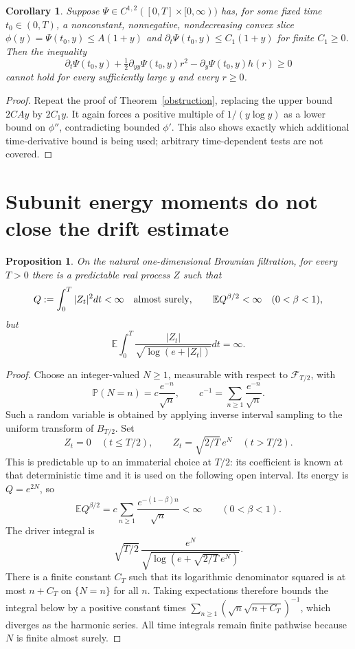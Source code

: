 \documentclass[11pt]{article}
\newtheorem{proposition}[theorem]{Proposition}
\newtheorem{corollary}[theorem]{Corollary}
\newcommand{\E}{\mathbb E}
\newcommand{\Prb}{\mathbb P}
\newcommand{\F}{\mathcal F}
\begin{document}
\begin{corollary}\label{timebound}
Suppose $\Psi\in C^{1,2}([0,T]\times[0,\infty))$ has, for some fixed
time $t_0\in(0,T)$, a nonconstant, nonnegative, nondecreasing convex
slice $\phi(y)=\Psi(t_0,y)\leq A(1+y)$ and
$\partial_t\Psi(t_0,y)\leq C_1(1+y)$ for finite $C_1\geq0$.
Then the inequality
\[
 \partial_t\Psi(t_0,y)+\tfrac12\partial_{yy}\Psi(t_0,y)r^2
                -\partial_y\Psi(t_0,y)h(r)\geq0
\]
cannot hold for every sufficiently large $y$ and every $r\geq0$.
\end{corollary}
\begin{proof}
Repeat the proof of Theorem~\ref{obstruction}, replacing the upper bound
$2CAy$ by $2C_1y$. It again forces a positive multiple of
$1/(y\log y)$ as a lower bound on $\phi''$, contradicting bounded
$\phi'$. This also shows exactly which additional time-derivative
bound is being used; arbitrary time-dependent tests are not covered.
\end{proof}

\section{Subunit energy moments do not close the drift estimate}
\begin{proposition}\label{energy}
On the natural one-dimensional Brownian filtration, for every $T>0$
there is a predictable real process $Z$ such that
\[
 Q:=\int_0^T|Z_t|^2dt<\infty\quad\hbox{almost surely},\qquad
 \E Q^{\beta/2}<\infty\quad(0<\beta<1),
\]
but
\[
 \E\int_0^T\frac{|Z_t|}{\sqrt{\log(e+|Z_t|)}}dt=\infty.
\]
\end{proposition}
\begin{proof}
Choose an integer-valued $N\geq1$, measurable with respect to
$\F_{T/2}$, with
\[
 \Prb(N=n)=c\frac{e^{-n}}{\sqrt n},\qquad
 c^{-1}=\sum_{n\geq1}\frac{e^{-n}}{\sqrt n}.
\]
Such a random variable is obtained by applying inverse interval sampling
to the uniform transform of $B_{T/2}$. Set
\[
 Z_t=0\quad(t\leq T/2),\qquad
 Z_t=\sqrt{2/T}\,e^N\quad(t>T/2).
\]
This is predictable up to an immaterial choice at $T/2$: its coefficient
is known at that deterministic time and it is used on the following open
interval. Its energy is $Q=e^{2N}$, so
\[
 \E Q^{\beta/2}
 =c\sum_{n\geq1}\frac{e^{-(1-\beta)n}}{\sqrt n}<\infty
 \qquad(0<\beta<1).
\]
The driver integral is
\[
 \sqrt{T/2}\,\frac{e^N}{\sqrt{\log(e+\sqrt{2/T}\,e^N)}}.
\]
There is a finite constant $C_T$ such that its logarithmic denominator
squared is at most $n+C_T$ on $\{N=n\}$ for all $n$.
Taking expectations therefore bounds the integral below by a positive
constant times
$\sum_{n\geq1}(\sqrt n\sqrt{n+C_T})^{-1}$, which diverges as the
harmonic series. All time integrals remain finite pathwise because $N$
is finite almost surely.
\end{proof}
\end{document}
